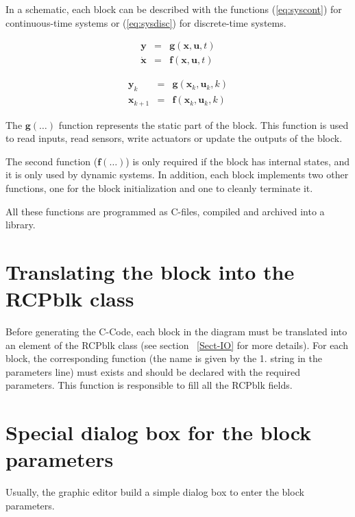 In a schematic, each block can be described with the functions 
(\ref{eq:syscont}) for continuous-time systems or (\ref{eq:sysdisc}) for 
discrete-time systems.

\begin{equation}
\label{eq:syscont}
\begin{array}{lll}
\mathbf{y} & = & \mathbf{g}(\mathbf{x},\mathbf{u},t) \\
\dot{\mathbf{x}} & = & \mathbf{f}(\mathbf{x},\mathbf{u},t) 
\end{array}
\end{equation}

\begin{equation}
\label{eq:sysdisc}
\begin{array}{lll}
\mathbf{y}_k & = & \mathbf{g}(\mathbf{x}_k,\mathbf{u}_k,k) \\
\mathbf{x}_{k+1} & = & \mathbf{f}(\mathbf{x}_k,\mathbf{u}_k,k) 
\end{array}
\end{equation}

The $\mathbf{g}(\ldots)$ function represents the static part of the block. 
This function is used to read inputs, read sensors, write actuators or 
update the outputs of the block.

The second function ($\mathbf{f}(\ldots)$) is only required if the block has 
internal states, and it is only used by dynamic systems. In 
addition, each block implements two other functions, one for the block 
initialization and one to cleanly terminate it.

All these functions are programmed as C-files, compiled and archived into a 
library.

\section{Translating the block into the RCPblk class}
Before generating the C-Code, each block in the diagram must be translated into 
an element of the RCPblk class (see section ~\ref{Sect-IO} for more details).
For each block, the corresponding function (the name is given by the 1. string 
in the parameters line) 
must exists and should be declared with the required parameters. This function 
is responsible to fill all the RCPblk fields.

\section{Special dialog box for the block parameters}
Usually, the graphic editor build a simple dialog box to enter the block 
parameters. 

